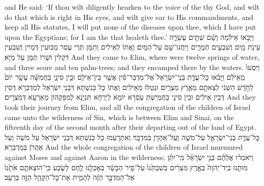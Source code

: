 {and He said: ‘If thou wilt diligently hearken to the voice of the \lord\space thy God, and wilt do that which is right in His eyes, and wilt give ear to His commandments, and keep all His statutes, I will put none of the diseases upon thee, which I have put upon the Egyptians; for I am the \lord\space that healeth thee.’}{}
{וַיָּבֹ֣אוּ אֵילִ֔מָה וְשָׁ֗ם שְׁתֵּ֥ים עֶשְׂרֵ֛ה עֵינֹ֥ת מַ֖יִם וְשִׁבְעִ֣ים תְּמָרִ֑ים וַיַּחֲנוּ־שָׁ֖ם עַל־הַמָּֽיִם׃
}
{וַאֲתוֹ לְאֵילִים וְתַמָּן תְּרֵי עֲסַר מַבּוּעִין דְּמַיִין וְשִׁבְעִין דִּקְלִין וּשְׁרוֹ תַּמָּן עַל מַיָּא׃}
{And they came to Elim, where were twelve springs of water, and three score and ten palm-trees; and they encamped there by the waters.}{}
\newperek
{}%
{וַיִּסְעוּ֙ מֵֽאֵילִ֔ם וַיָּבֹ֜אוּ כׇּל־עֲדַ֤ת בְּנֵֽי־יִשְׂרָאֵל֙ אֶל־מִדְבַּר־סִ֔ין אֲשֶׁ֥ר בֵּין־אֵילִ֖ם וּבֵ֣ין סִינָ֑י בַּחֲמִשָּׁ֨ה עָשָׂ֥ר יוֹם֙ לַחֹ֣דֶשׁ הַשֵּׁנִ֔י לְצֵאתָ֖ם מֵאֶ֥רֶץ מִצְרָֽיִם׃
}
{וּנְטַלוּ מֵאֵילִים וַאֲתוֹ כָּל כְּנִשְׁתָּא דִּבְנֵי יִשְׂרָאֵל לְמַדְבְּרָא דְּסִין דְּבֵין אֵילִים וּבֵין סִינָי בַּחֲמֵישְׁתְּ עַסְרָא יוֹמָא לְיַרְחָא תִּנְיָנָא לְמִפַּקְהוֹן מֵאַרְעָא דְּמִצְרָיִם׃}
{And they took their journey from Elim, and all the congregation of the children of Israel came unto the wilderness of Sin, which is between Elim and Sinai, on the fifteenth day of the second month after their departing out of the land of Egypt.}{}
{ כׇּל־עֲדַ֧ת בְּנֵי־יִשְׂרָאֵ֛ל עַל־מֹשֶׁ֥ה וְעַֽל־אַהֲרֹ֖ן בַּמִּדְבָּֽר׃
}
{וְאִתְרָעַמוּ כָּל כְּנִשְׁתָּא דִּבְנֵי יִשְׂרָאֵל עַל מֹשֶׁה וְעַל אַהֲרֹן בְּמַדְבְּרָא׃}
{And the whole congregation of the children of Israel murmured against Moses and against Aaron in the wilderness;}{}
{וַיֹּאמְר֨וּ אֲלֵהֶ֜ם בְּנֵ֣י יִשְׂרָאֵ֗ל מִֽי־יִתֵּ֨ן מוּתֵ֤נוּ בְיַד־יְהֹוָה֙ בְּאֶ֣רֶץ מִצְרַ֔יִם בְּשִׁבְתֵּ֙נוּ֙ עַל־סִ֣יר הַבָּשָׂ֔ר בְּאׇכְלֵ֥נוּ לֶ֖חֶם לָשֹׂ֑בַע כִּֽי־הוֹצֵאתֶ֤ם אֹתָ֙נוּ֙ אֶל־הַמִּדְבָּ֣ר הַזֶּ֔ה לְהָמִ֛ית אֶת־כׇּל־הַקָּהָ֥ל הַזֶּ֖ה בָּרָעָֽב׃ \setuma         
}
